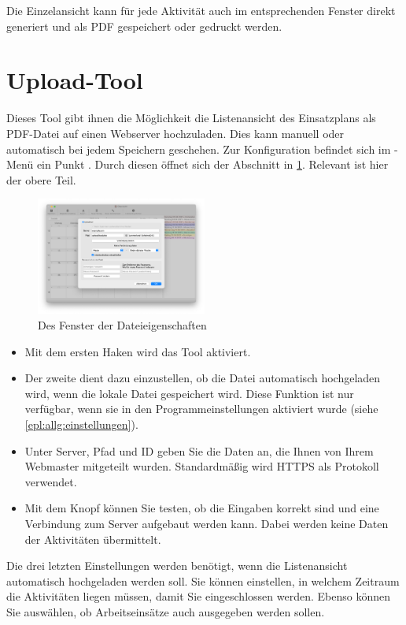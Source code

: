 Die Einzelansicht kann für jede Aktivität auch im entsprechenden Fenster direkt generiert und als PDF gespeichert oder gedruckt werden.




\section{Upload-Tool}\label{einsatz:kalender:upload}
Dieses Tool gibt ihnen die Möglichkeit die Listenansicht des Einsatzplans als PDF-Datei auf einen Webserver hochzuladen.
Dies kann manuell oder automatisch bei jedem Speichern geschehen.
Zur Konfiguration befindet sich im -Menü ein Punkt .
Durch diesen öffnet sich der Abschnitt in \cref{fig:einsatz:kalender:upload}.
Relevant ist hier der obere Teil.
\begin{figure}[!h]
  \centering
	\includegraphics[width=0.5\textwidth]{img/eigenschaften}
	\caption{Des Fenster der Dateieigenschaften}
	\label{fig:einsatz:kalender:upload}
\end{figure}
\begin{itemize}
  \item
  Mit dem ersten Haken wird das Tool aktiviert.
  \item
  Der zweite dient dazu einzustellen, ob die Datei automatisch hochgeladen wird, wenn die lokale Datei gespeichert wird.
  Diese Funktion ist nur verfügbar, wenn sie in den Programmeinstellungen aktiviert wurde (siehe \cref{epl:allg:einstellungen}).
  \item
  Unter Server, Pfad und ID geben Sie die Daten an, die Ihnen von Ihrem Webmaster mitgeteilt wurden.
  Standardmäßig wird HTTPS als Protokoll verwendet.
  \item
  Mit dem Knopf können Sie testen, ob die Eingaben korrekt sind und eine Verbindung zum Server aufgebaut werden kann.
  Dabei werden keine Daten der Aktivitäten übermittelt.
\end{itemize}
Die drei letzten Einstellungen werden benötigt, wenn die Listenansicht automatisch hochgeladen werden soll.
Sie können einstellen, in welchem Zeitraum die Aktivitäten liegen müssen, damit Sie eingeschlossen werden.
Ebenso können Sie auswählen, ob Arbeitseinsätze auch ausgegeben werden sollen.

